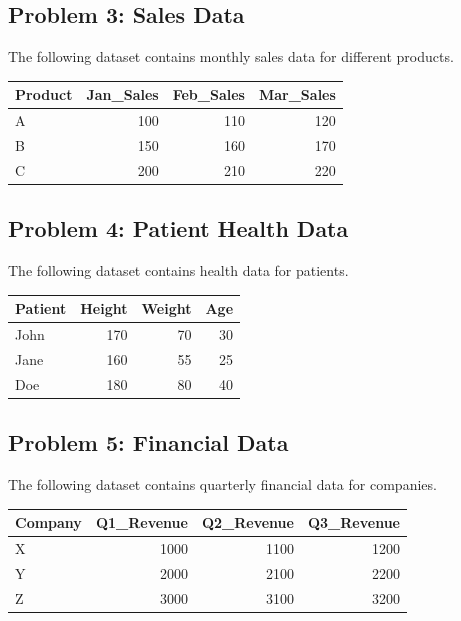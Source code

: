 \documentclass[
  letterpaper,
  DIV=11,
  numbers=noendperiod]{scrreprt}
\begin{document}
\subsection*{Problem 3: Sales Data}\label{problem-3-sales-data}

The following dataset contains monthly sales data for different
products.

\begin{table}
\centering
\begin{tabular}{l|r|r|r}
\hline
Product & Jan\_Sales & Feb\_Sales & Mar\_Sales\\
\hline
A & 100 & 110 & 120\\
\hline
B & 150 & 160 & 170\\
\hline
C & 200 & 210 & 220\\
\hline
\end{tabular}
\end{table}

\subsection*{Problem 4: Patient Health
Data}\label{problem-4-patient-health-data}

The following dataset contains health data for patients.

\begin{table}
\centering
\begin{tabular}{l|r|r|r}
\hline
Patient & Height & Weight & Age\\
\hline
John & 170 & 70 & 30\\
\hline
Jane & 160 & 55 & 25\\
\hline
Doe & 180 & 80 & 40\\
\hline
\end{tabular}
\end{table}

\subsection*{Problem 5: Financial Data}\label{problem-5-financial-data}

The following dataset contains quarterly financial data for companies.

\begin{table}
\centering
\begin{tabular}{l|r|r|r}
\hline
Company & Q1\_Revenue & Q2\_Revenue & Q3\_Revenue\\
\hline
X & 1000 & 1100 & 1200\\
\hline
Y & 2000 & 2100 & 2200\\
\hline
Z & 3000 & 3100 & 3200\\
\hline
\end{tabular}
\end{table}
\end{document}
